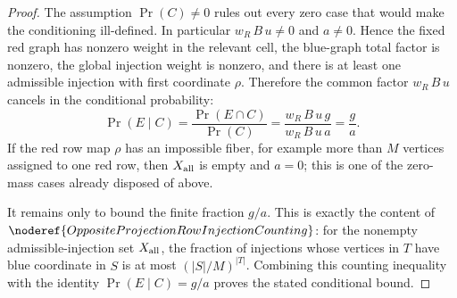 \begin{proof}
The assumption \(\Pr(C)\ne0\) rules out every zero case that would make the
conditioning ill-defined.  In particular \(w_R\,B\,u\ne0\) and
\(a\ne0\).  Hence the fixed red graph has nonzero weight in the relevant
cell, the blue-graph total factor is nonzero, the global injection weight is
nonzero, and there is at least one admissible injection with first coordinate
\(\rho\).  Therefore the common factor \(w_R\,B\,u\) cancels in the
conditional probability:
\[
\Pr(E\mid C)
=\frac{\Pr(E\cap C)}{\Pr(C)}
=\frac{w_R\,B\,u\,g}{w_R\,B\,u\,a}
=\frac{g}{a}.
\]
If the red row map \(\rho\) has an impossible fiber, for example more than
\(M\) vertices assigned to one red row, then \(X_{\rm all}\) is empty and
\(a=0\); this is one of the zero-mass cases already disposed of above.

It remains only to bound the finite fraction \(g/a\).  This is exactly the
content of \(\noderef{OppositeProjectionRowInjectionCounting}\): for the
nonempty admissible-injection set \(X_{\rm all}\), the fraction of injections
whose vertices in \(T\) have blue coordinate in \(S\) is at most
\((|S|/M)^{|T|}\).  Combining this counting inequality with the identity
\(\Pr(E\mid C)=g/a\) proves the stated conditional bound.
\end{proof}
